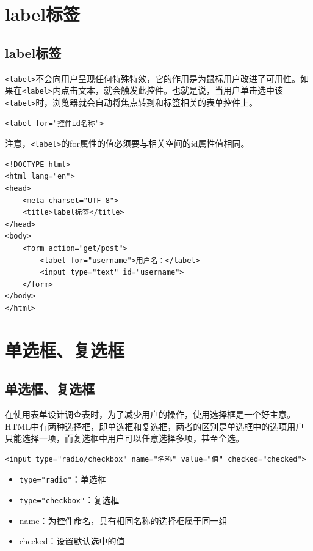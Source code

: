 \newpage

\section{label标签}

\subsection{label标签}

\lstinline|<label>|不会向用户呈现任何特殊特效，它的作用是为鼠标用户改进了可用性。如果在\lstinline|<label>|内点击文本，就会触发此控件。也就是说，当用户单击选中该\lstinline|<label>|时，浏览器就会自动将焦点转到和标签相关的表单控件上。

\begin{lstlisting}[style=htmlcssjs]
<label for="控件id名称">
\end{lstlisting}

注意，\lstinline|<label>|的for属性的值必须要与相关空间的id属性值相同。

\begin{lstlisting}[style=htmlcssjs, title=label标签]
<!DOCTYPE html>
<html lang="en">
<head>
    <meta charset="UTF-8">
    <title>label标签</title>
</head>
<body>
    <form action="get/post">
        <label for="username">用户名：</label>
        <input type="text" id="username">
    </form>
</body>
</html>
\end{lstlisting}

\newpage

\section{单选框、复选框}

\subsection{单选框、复选框}

在使用表单设计调查表时，为了减少用户的操作，使用选择框是一个好主意。HTML中有两种选择框，即单选框和复选框，两者的区别是单选框中的选项用户只能选择一项，而复选框中用户可以任意选择多项，甚至全选。 \\

\begin{lstlisting}[style=htmlcssjs]
<input type="radio/checkbox" name="名称" value="值" checked="checked">
\end{lstlisting}

\begin{itemize}
    \item \lstinline|type="radio"|：单选框
    \item \lstinline|type="checkbox"|：复选框
    \item name：为控件命名，具有相同名称的选择框属于同一组
    \item checked：设置默认选中的值
\end{itemize}

